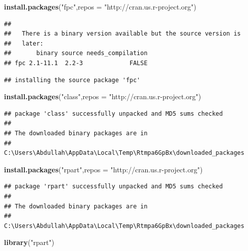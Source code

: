 \documentclass[]{article}
\newenvironment{Shaded}{\begin{snugshade}}{\end{snugshade}}
\newcommand{\KeywordTok}[1]{\textcolor[rgb]{0.13,0.29,0.53}{\textbf{#1}}}
\newcommand{\DataTypeTok}[1]{\textcolor[rgb]{0.13,0.29,0.53}{#1}}
\newcommand{\StringTok}[1]{\textcolor[rgb]{0.31,0.60,0.02}{#1}}
\newcommand{\NormalTok}[1]{#1}
\begin{document}
\begin{Shaded}
\begin{Highlighting}[]
\KeywordTok{install.packages}\NormalTok{(}\StringTok{"fpc"}\NormalTok{,}\DataTypeTok{repos =} \StringTok{"http://cran.us.r-project.org"}\NormalTok{)}
\end{Highlighting}
\end{Shaded}

\begin{verbatim}
## 
##   There is a binary version available but the source version is
##   later:
##       binary source needs_compilation
## fpc 2.1-11.1  2.2-3             FALSE
\end{verbatim}

\begin{verbatim}
## installing the source package 'fpc'
\end{verbatim}

\begin{Shaded}
\begin{Highlighting}[]
\KeywordTok{install.packages}\NormalTok{(}\StringTok{"class"}\NormalTok{,}\DataTypeTok{repos =} \StringTok{"http://cran.us.r-project.org"}\NormalTok{)}
\end{Highlighting}
\end{Shaded}

\begin{verbatim}
## package 'class' successfully unpacked and MD5 sums checked
## 
## The downloaded binary packages are in
##  C:\Users\Abdullah\AppData\Local\Temp\Rtmpa6GpBx\downloaded_packages
\end{verbatim}

\begin{Shaded}
\begin{Highlighting}[]
\KeywordTok{install.packages}\NormalTok{(}\StringTok{"rpart"}\NormalTok{,}\DataTypeTok{repos =} \StringTok{"http://cran.us.r-project.org"}\NormalTok{)}
\end{Highlighting}
\end{Shaded}

\begin{verbatim}
## package 'rpart' successfully unpacked and MD5 sums checked
## 
## The downloaded binary packages are in
##  C:\Users\Abdullah\AppData\Local\Temp\Rtmpa6GpBx\downloaded_packages
\end{verbatim}

\begin{Shaded}
\begin{Highlighting}[]
\KeywordTok{library}\NormalTok{(}\StringTok{"rpart"}\NormalTok{)}
\end{Highlighting}
\end{Shaded}
\end{document}
